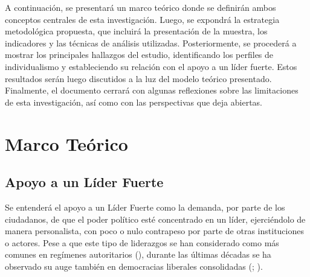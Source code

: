 \documentclass[
  letterpaper,
  DIV=11,
  numbers=noendperiod]{scrartcl}
\begin{document}
A continuación, se presentará un marco teórico donde se definirán ambos
conceptos centrales de esta investigación. Luego, se expondrá la
estrategia metodológica propuesta, que incluirá la presentación de la
muestra, los indicadores y las técnicas de análisis utilizadas.
Posteriormente, se procederá a mostrar los principales hallazgos del
estudio, identificando los perfiles de individualismo y estableciendo su
relación con el apoyo a un líder fuerte. Estos resultados serán luego
discutidos a la luz del modelo teórico presentado. Finalmente, el
documento cerrará con algunas reflexiones sobre las limitaciones de esta
investigación, así como con las perspectivas que deja abiertas.

\section*{Marco Teórico}\label{marco-teuxf3rico}

\subsection*{Apoyo a un Líder Fuerte}\label{apoyo-a-un-luxedder-fuerte}

Se entenderá el apoyo a un Líder Fuerte como la demanda, por parte de
los ciudadanos, de que el poder político esté concentrado en un líder,
ejerciéndolo de manera personalista, con poco o nulo contrapeso por
parte de otras instituciones o actores. Pese a que este tipo de
liderazgos se han considerado como más comunes en regímenes autoritarios
(), durante las últimas décadas se ha observado su auge también en
democracias liberales consolidadas
(;
).
\end{document}
